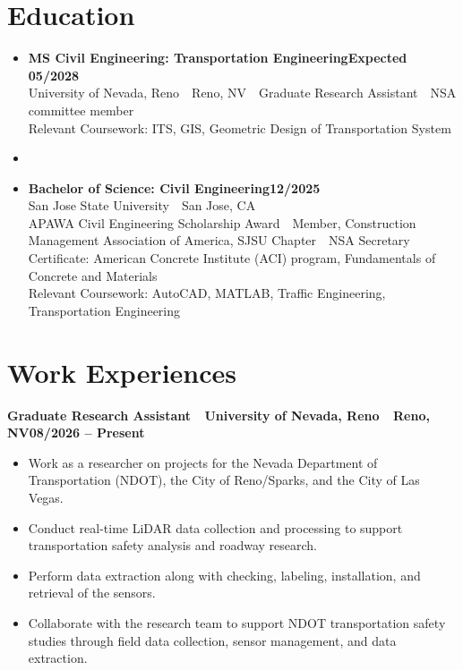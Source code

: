 \documentclass[9pt,letterpaper]{extarticle}
\newcommand{\sep}{\,\textbar\,}
\newcommand{\entry}[2]{\vspace{2pt}\textbf{#1}\hfill\textbf{#2}\par}
\begin{document}
\section{Education}
\begin{itemize}
  \item \textbf{MS Civil Engineering: Transportation Engineering}\hfill\textbf{Expected 05/2028}\\
        University of Nevada, Reno \sep{} Reno, NV \sep{} Graduate Research Assistant \sep{} NSA committee member\\
        Relevant Coursework: ITS, GIS, Geometric Design of Transportation System
  \item[] \vspace{-8pt}
  \item \textbf{Bachelor of Science: Civil Engineering}\hfill\textbf{12/2025}\\
        San Jose State University \sep{} San Jose, CA\\
        APAWA Civil Engineering Scholarship Award \sep{} Member, Construction Management Association of America, SJSU Chapter \sep{} NSA Secretary\\
        Certificate: American Concrete Institute (ACI) program, Fundamentals of Concrete and Materials\\
        Relevant Coursework: AutoCAD, MATLAB, Traffic Engineering, Transportation Engineering
\end{itemize}

\section{Work Experiences}
\entry{Graduate Research Assistant \sep{} University of Nevada, Reno \sep{} Reno, NV}{08/2026 -- Present}
\begin{itemize}
  \item Work as a researcher on projects for the Nevada Department of Transportation (NDOT), the City of Reno/Sparks, and the City of Las Vegas.
  \item Conduct real-time LiDAR data collection and processing to support transportation safety analysis and roadway research.
  \item Perform data extraction along with checking, labeling, installation, and retrieval of the sensors.
  \item Collaborate with the research team to support NDOT transportation safety studies through field data collection, sensor management, and data extraction.
\end{itemize}
\end{document}
